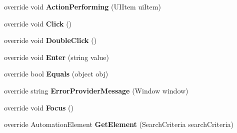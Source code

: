 \begin{DoxyCompactItemize}
\item 
\hypertarget{class_proto_test_1_1_golem_1_1_white_1_1_elements_1_1_white_spinner_a23ae844aec4a76373c7dc9af61fdcfe1}{override void {\bfseries Action\-Performing} (U\-I\-Item ui\-Item)}\label{class_proto_test_1_1_golem_1_1_white_1_1_elements_1_1_white_spinner_a23ae844aec4a76373c7dc9af61fdcfe1}

\item 
\hypertarget{class_proto_test_1_1_golem_1_1_white_1_1_elements_1_1_white_spinner_a1a94b21348679beae3a47d8e1faa6af6}{override void {\bfseries Click} ()}\label{class_proto_test_1_1_golem_1_1_white_1_1_elements_1_1_white_spinner_a1a94b21348679beae3a47d8e1faa6af6}

\item 
\hypertarget{class_proto_test_1_1_golem_1_1_white_1_1_elements_1_1_white_spinner_a39dfbe334e804412183abfa7f1570357}{override void {\bfseries Double\-Click} ()}\label{class_proto_test_1_1_golem_1_1_white_1_1_elements_1_1_white_spinner_a39dfbe334e804412183abfa7f1570357}

\item 
\hypertarget{class_proto_test_1_1_golem_1_1_white_1_1_elements_1_1_white_spinner_ac31147cd3447385d3d257778309a3fdd}{override void {\bfseries Enter} (string value)}\label{class_proto_test_1_1_golem_1_1_white_1_1_elements_1_1_white_spinner_ac31147cd3447385d3d257778309a3fdd}

\item 
\hypertarget{class_proto_test_1_1_golem_1_1_white_1_1_elements_1_1_white_spinner_a06f6c574e0eab0aecba83c5bd47ecc1d}{override bool {\bfseries Equals} (object obj)}\label{class_proto_test_1_1_golem_1_1_white_1_1_elements_1_1_white_spinner_a06f6c574e0eab0aecba83c5bd47ecc1d}

\item 
\hypertarget{class_proto_test_1_1_golem_1_1_white_1_1_elements_1_1_white_spinner_a0e25d3bb9e1e8ae378804556ff0e2c67}{override string {\bfseries Error\-Provider\-Message} (Window window)}\label{class_proto_test_1_1_golem_1_1_white_1_1_elements_1_1_white_spinner_a0e25d3bb9e1e8ae378804556ff0e2c67}

\item 
\hypertarget{class_proto_test_1_1_golem_1_1_white_1_1_elements_1_1_white_spinner_a348ba000e2f65445d006c151baf97a13}{override void {\bfseries Focus} ()}\label{class_proto_test_1_1_golem_1_1_white_1_1_elements_1_1_white_spinner_a348ba000e2f65445d006c151baf97a13}

\item 
\hypertarget{class_proto_test_1_1_golem_1_1_white_1_1_elements_1_1_white_spinner_a81f4b85ecccbf167fa78aac7e22834c7}{override Automation\-Element {\bfseries Get\-Element} (Search\-Criteria search\-Criteria)}\label{class_proto_test_1_1_golem_1_1_white_1_1_elements_1_1_white_spinner_a81f4b85ecccbf167fa78aac7e22834c7}


\end{DoxyCompactItemize}
